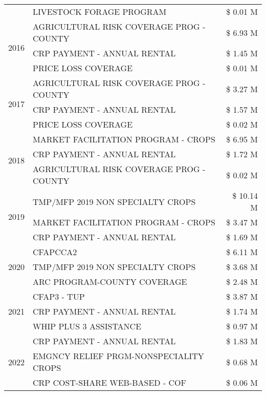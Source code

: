 \begin{tabular}{llr}
 & LIVESTOCK FORAGE PROGRAM & \$ 0.01 M \\
\cline{1-3}
\multirow[t]{3}{*}{2016} & AGRICULTURAL RISK COVERAGE PROG - COUNTY & \$ 6.93 M \\
 & CRP PAYMENT - ANNUAL RENTAL & \$ 1.45 M \\
 & PRICE LOSS COVERAGE & \$ 0.01 M \\
\cline{1-3}
\multirow[t]{3}{*}{2017} & AGRICULTURAL RISK COVERAGE PROG - COUNTY & \$ 3.27 M \\
 & CRP PAYMENT - ANNUAL RENTAL & \$ 1.57 M \\
 & PRICE LOSS COVERAGE & \$ 0.02 M \\
\cline{1-3}
\multirow[t]{3}{*}{2018} & MARKET FACILITATION PROGRAM - CROPS & \$ 6.95 M \\
 & CRP PAYMENT - ANNUAL RENTAL & \$ 1.72 M \\
 & AGRICULTURAL RISK COVERAGE PROG - COUNTY & \$ 0.02 M \\
\cline{1-3}
\multirow[t]{3}{*}{2019} & TMP/MFP 2019 NON SPECIALTY CROPS & \$ 10.14 M \\
 & MARKET FACILITATION PROGRAM - CROPS & \$ 3.47 M \\
 & CRP PAYMENT - ANNUAL RENTAL & \$ 1.69 M \\
\cline{1-3}
\multirow[t]{3}{*}{2020} & CFAPCCA2 & \$ 6.11 M \\
 & TMP/MFP 2019 NON SPECIALTY CROPS & \$ 3.68 M \\
 & ARC PROGRAM-COUNTY COVERAGE & \$ 2.48 M \\
\cline{1-3}
\multirow[t]{3}{*}{2021} & CFAP3 - TUP & \$ 3.87 M \\
 & CRP PAYMENT - ANNUAL RENTAL & \$ 1.74 M \\
 & WHIP PLUS 3 ASSISTANCE & \$ 0.97 M \\
\cline{1-3}
\multirow[t]{3}{*}{2022} & CRP PAYMENT - ANNUAL RENTAL & \$ 1.83 M \\
 & EMGNCY RELIEF PRGM-NONSPECIALITY CROPS & \$ 0.68 M \\
 & CRP COST-SHARE WEB-BASED - COF & \$ 0.06 M \\
\cline{1-3}
\bottomrule
\end{tabular}
